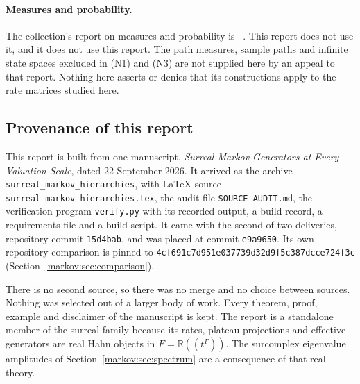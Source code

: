 \documentclass[11pt]{article}
\numberwithin{equation}{section}
\theoremstyle{definition}
\theoremstyle{remark}
\newcommand{\R}{\mathbb R}
\newcommand{\revsha}{\texttt{4cf691c7d951e037739d32d9f5c387dcce724f3c}}
\begin{document}
\paragraph{Measures and probability.}
The collection's report on measures and probability is
~\cite{CollMeas}.
This report does not use it, and it does not use this report. The path measures,
sample paths and infinite state spaces excluded in (N1) and (N3) are not
supplied here by an appeal to that report. Nothing here asserts or denies that
its constructions apply to the rate matrices studied here.

\subsection{Provenance of this report}\label{markov:sec:provenance}

This report is built from one manuscript, \emph{Surreal Markov Generators at
Every Valuation Scale}, dated 22 September 2026. It arrived as the archive
\texttt{surreal\_markov\_hierarchies}, with LaTeX source
\texttt{surreal\_markov\_hierarchies.tex}, the audit file
\texttt{SOURCE\_AUDIT.md}, the verification program \texttt{verify.py} with its
recorded output, a build record, a requirements file and a build script. It came
with the second of two deliveries, repository commit \texttt{15d4bab}, and was
placed at commit \texttt{e9a9650}. Its own repository comparison is pinned to
\revsha{} (Section~\ref{markov:sec:comparison}).

There is no second source, so there was no merge and no choice between sources.
Nothing was selected out of a larger body of work. Every theorem, proof, example
and disclaimer of the manuscript is kept. The report is a standalone member of
the surreal family because its rates, plateau projections and effective
generators are real Hahn objects in $F=\R((t^\Gamma))$. The surcomplex eigenvalue
amplitudes of Section~\ref{markov:sec:spectrum} are a consequence of that real
theory.
\end{document}
